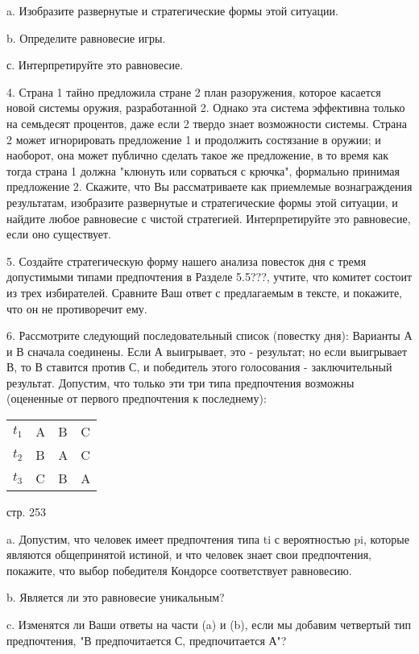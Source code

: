 \documentclass[a4paper,12pt]{article}
\begin{document}
a. Изобразите развернутые и стратегические формы
этой ситуации.

b. Определите равновесие игры.

с. Интерпретируйте это равновесие.

4. Страна 1 тайно предложила стране 2 план
разоружения, которое касается новой системы оружия,
разработанной 2. Однако эта система эффективна
только на семьдесят процентов, даже если 2 твердо
знает возможности системы. Страна 2 может
игнорировать предложение 1 и продолжить состязание
в оружии; и наоборот, она может публично сделать
такое же предложение, в то время как тогда страна 1
должна "клюнуть или сорваться с крючка", формально
принимая предложение 2. Скажите, что Вы
рассматриваете как приемлемые вознаграждения
результатам, изобразите развернутые и
стратегические формы этой ситуации, и найдите любое
равновесие с чистой стратегией. Интерпретируйте это
равновесие, если оно существует.

5. Создайте стратегическую форму нашего  анализа
повесток дня с тремя допустимыми типами
предпочтения в Разделе 5.5???, учтите, что комитет
состоит из трех избирателей. Сравните Ваш ответ с
предлагаемым в тексте, и покажите, что он не
противоречит ему.

6. Рассмотрите следующий последовательный список
(повестку дня): Варианты А и В сначала соединены.
Если А выигрывает, это - результат; но если
выигрывает В, то В ставится против С, и победитель
этого голосования - заключительный результат.
Допустим, что только эти три типа предпочтения
возможны (оцененные от первого предпочтения к
последнему):

\begin{tabular}{llll}
$t_{1}$ & A & B & C \\ $t_{2}$ & B & A & C \\
$t_{3}$ & C & B & A\end{tabular}

стр. 253

a. Допустим, что человек имеет предпочтения типа ti
с вероятностью pi, которые являются общепринятой
истиной, и что человек знает свои предпочтения,
покажите, что выбор победителя Кондорсе
соответствует равновесию.

b. Является ли это равновесие уникальным?

c. Изменятся ли Ваши ответы на части (a) и (b),
если мы добавим четвертый тип предпочтения, "В
предпочитается С, предпочитается А"?
\end{document}
